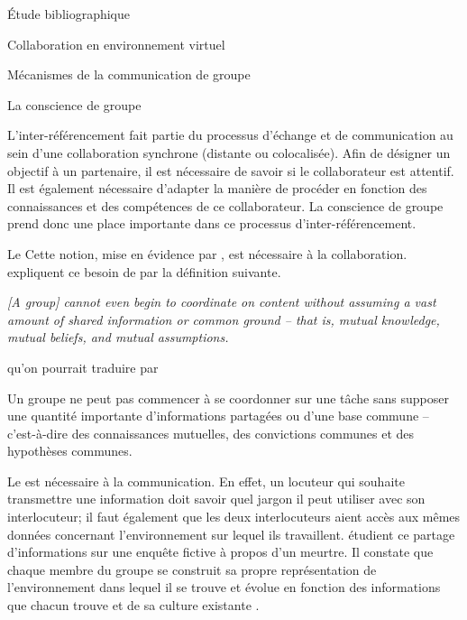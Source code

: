 \documentclass[myfrancais,ngerman,english,french]{mythesis}
\begin{document}
\begin{mychapter}{Étude bibliographique}
\begin{mysection}{Collaboration en environnement virtuel}
\begin{mysubsection}{Mécanismes de la communication de groupe}
\begin{mysubsubsection}{La conscience de groupe}
					\begin{myfigure}
					\end{myfigure}

					L'inter-référencement fait partie du processus d'échange et de communication au sein d'une collaboration synchrone (distante ou colocalisée).
					Afin de désigner un objectif à un partenaire, il est nécessaire de savoir si le collaborateur est attentif.
					Il est également nécessaire d'adapter la manière de procéder en fonction des connaissances et des compétences de ce collaborateur.
					La conscience de groupe prend donc une place importante dans ce processus d'inter-référencement.
				\end{mysubsubsection}
				\begin{mysubsubsection}{Le \mygrounding}
					Cette notion, mise en évidence par , est nécessaire à la collaboration.
					 expliquent ce besoin de \mygrounding par la définition suivante.
					\begin{myquote}[english]
						\it [A group] cannot even begin to coordinate on content without assuming a vast amount of shared information or common ground -- that is, mutual knowledge, mutual beliefs, and mutual assumptions.
					\end{myquote}
					qu'on pourrait traduire par
					\begin{myquote}[french]
						Un groupe ne peut pas commencer à se coordonner sur une tâche sans supposer une quantité importante d'informations partagées ou d'une base commune -- c'est-à-dire des connaissances mutuelles, des convictions communes et des hypothèses communes.
					\end{myquote}

					Le \mygrounding est nécessaire à la communication.
					En effet, un locuteur qui souhaite transmettre une information doit savoir quel jargon il peut utiliser avec son interlocuteur; il faut également que les deux interlocuteurs aient accès aux mêmes données concernant l'environnement sur lequel ils travaillent.
					 étudient ce partage d'informations sur une enquête fictive à propos d'un meurtre.
					Il constate que chaque membre du groupe se construit sa propre représentation de l'environnement dans lequel il se trouve et évolue en fonction des informations que chacun trouve et de sa culture existante .


\end{mysubsubsection}
\end{mysubsection}
\end{mysection}
\end{mychapter}
\end{document}

